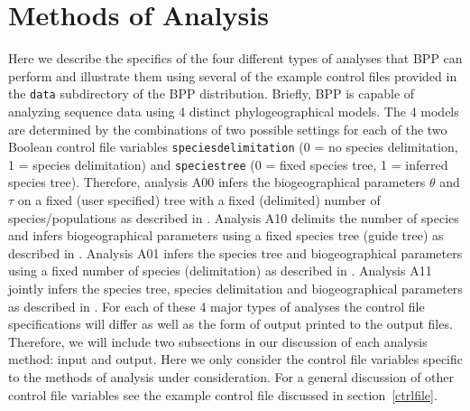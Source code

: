 \documentclass{book}
\numberwithin{equation}{section} \renewcommand{\baselinestretch}{0.55}
\begin{document}
 \chapter{Methods of Analysis} \label{analysismethods} Here we
 describe the specifics of the four different types of analyses that
 BPP can perform and illustrate them using several of
 the example control files provided in the
 \texttt{data} subdirectory of the BPP distribution. Briefly, BPP is
 capable of analyzing sequence data using 4 distinct phylogeographical
 models. The 4 models are determined by the combinations of two
 possible settings for each of the two Boolean control file variables
 \texttt{speciesdelimitation} (0 = no species delimitation, 1 =
 species delimitation) and \texttt{speciestree} (0 = fixed species
 tree, 1 = inferred species tree). Therefore, analysis A00 infers the
 biogeographical parameters $\theta$ and $\tau$ on a fixed (user
 specified) tree with a fixed (delimited) number of
 species/populations as described in \cite{Rannala2003}.  Analysis A10
 delimits the number of species and infers biogeographical parameters
 using a fixed species tree (guide tree) as described in
 \cite{Yang2010}.  Analysis A01 infers the species tree and
 biogeographical parameters using a fixed number of species
 (delimitation) as described in \cite{Rannala2017}.  Analysis A11
 jointly infers the species tree, species delimitation and
 biogeographical parameters as described in \cite{Yang2014a}. For each
 of these 4 major types of analyses the control file specifications
 will differ as well as the form of output printed to the output
 files. Therefore, we will include two subsections in our discussion
 of each analysis method: input and output. Here we only consider the
 control file variables specific to the methods of analysis under
 consideration. For a general discussion of other control file
 variables see the example control file discussed in
 section~\ref{ctrlfile}.
\end{document}
